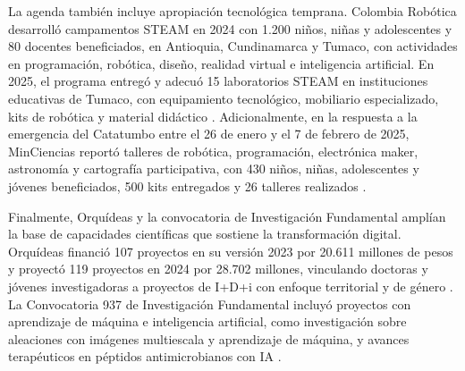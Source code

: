 La agenda también incluye apropiación tecnológica temprana. Colombia Robótica desarrolló campamentos STEAM en 2024 con 1.200 niños, niñas y adolescentes y 80 docentes beneficiados, en Antioquia, Cundinamarca y Tumaco, con actividades en programación, robótica, diseño, realidad virtual e inteligencia artificial. En 2025, el programa entregó y adecuó 15 laboratorios STEAM en instituciones educativas de Tumaco, con equipamiento tecnológico, mobiliario especializado, kits de robótica y material didáctico \parencite{minciencias_rendicion_2024_2025_pdf}. Adicionalmente, en la respuesta a la emergencia del Catatumbo entre el 26 de enero y el 7 de febrero de 2025, MinCiencias reportó talleres de robótica, programación, electrónica maker, astronomía y cartografía participativa, con 430 niños, niñas, adolescentes y jóvenes beneficiados, 500 kits entregados y 26 talleres realizados \parencite{minciencias_rendicion_2024_2025_pdf}.

Finalmente, Orquídeas y la convocatoria de Investigación Fundamental amplían la base de capacidades científicas que sostiene la transformación digital. Orquídeas financió 107 proyectos en su versión 2023 por 20.611 millones de pesos y proyectó 119 proyectos en 2024 por 28.702 millones, vinculando doctoras y jóvenes investigadoras a proyectos de I+D+i con enfoque territorial y de género \parencite{minciencias_informe_gestion_2024_pdf}. La Convocatoria 937 de Investigación Fundamental incluyó proyectos con aprendizaje de máquina e inteligencia artificial, como investigación sobre aleaciones con imágenes multiescala y aprendizaje de máquina, y avances terapéuticos en péptidos antimicrobianos con IA \parencite{minciencias_informe_gestion_2024_pdf}.


